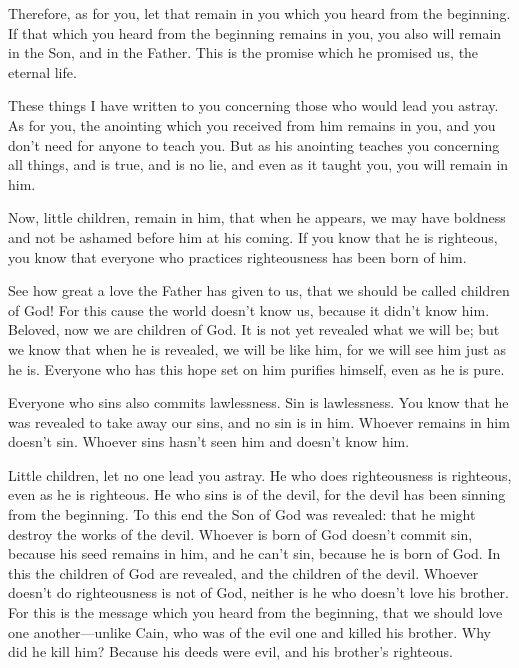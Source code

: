 \myverse{}Therefore, as for you, let that remain in you which you heard from the beginning. If that which you heard from the beginning remains in you, you also will remain in the Son, and in the Father. \myverse{}This is the promise which he promised us, the eternal life.


\myverse{}These things I have written to you concerning those who would lead you astray. \myverse{}As for you, the anointing which you received from him remains in you, and you don’t need for anyone to teach you. But as his anointing teaches you concerning all things, and is true, and is no lie, and even as it taught you, you will remain in him.


\myverse{}Now, little children, remain in him, that when he appears, we may have boldness and not be ashamed before him at his coming. \myverse{}If you know that he is righteous, you know that everyone who practices righteousness has been born of him.


\mychapter{} \myverse*{}See how great a love the Father has given to us, that we should be called children of God! For this cause the world doesn’t know us, because it didn’t know him. \myverse{}Beloved, now we are children of God. It is not yet revealed what we will be; but we know that when he is revealed, we will be like him, for we will see him just as he is. \myverse{}Everyone who has this hope set on him purifies himself, even as he is pure.


\myverse{}Everyone who sins also commits lawlessness. Sin is lawlessness. \myverse{}You know that he was revealed to take away our sins, and no sin is in him. \myverse{}Whoever remains in him doesn’t sin. Whoever sins hasn’t seen him and doesn’t know him.


\myverse{}Little children, let no one lead you astray. He who does righteousness is righteous, even as he is righteous. \myverse{}He who sins is of the devil, for the devil has been sinning from the beginning. To this end the Son of God was revealed: that he might destroy the works of the devil. \myverse{}Whoever is born of God doesn’t commit sin, because his seed remains in him, and he can’t sin, because he is born of God. \myverse{}In this the children of God are revealed, and the children of the devil. Whoever doesn’t do righteousness is not of God, neither is he who doesn’t love his brother. \myverse{}For this is the message which you heard from the beginning, that we should love one another—\myverse{}unlike Cain, who was of the evil one and killed his brother. Why did he kill him? Because his deeds were evil, and his brother’s righteous.


